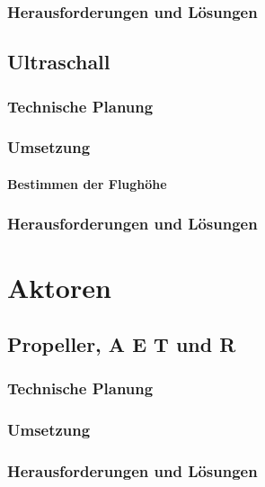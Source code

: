  \subsection{Herausforderungen und Lösungen}

\section{Ultraschall}

  \subsection{Technische Planung}

  \subsection{Umsetzung}

    \subsubsection{Bestimmen der Flughöhe}

  \subsection{Herausforderungen und Lösungen}

\chapter{Aktoren}
\renewcommand{\kapitelautor}{Autor: Lucas Ullrich}

\section{Propeller, A E T und R}

  \subsection{Technische Planung}

  \subsection{Umsetzung}

  \subsection{Herausforderungen und Lösungen}
